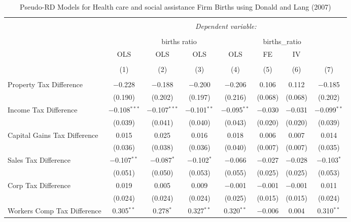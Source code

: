 
\begin{table}[!htbp] \centering 
  \caption{Pseudo-RD Models for  Health care and social assistance Firm Births using Donald and Lang (2007)} 
  \label{} 
\begin{tabular}{@{\extracolsep{5pt}}lccccccc} 
\\[-1.8ex]\hline 
\hline \\[-1.8ex] 
 & \multicolumn{7}{c}{\textit{Dependent variable:}} \\ 
\cline{2-8} 
\\[-1.8ex] & \multicolumn{4}{c}{births ratio} & \multicolumn{2}{c}{births\_ratio} &   \\ 
 & OLS & OLS & OLS & OLS & FE & IV &  \\ 
\\[-1.8ex] & (1) & (2) & (3) & (4) & (5) & (6) & (7)\\ 
\hline \\[-1.8ex] 
 Property Tax Difference & $-$0.228 & $-$0.188 & $-$0.200 & $-$0.206 & 0.106 & 0.112 & $-$0.185 \\ 
  & (0.190) & (0.202) & (0.197) & (0.216) & (0.068) & (0.068) & (0.202) \\ 
  Income Tax Difference & $-$0.108$^{***}$ & $-$0.107$^{***}$ & $-$0.101$^{**}$ & $-$0.095$^{**}$ & $-$0.030 & $-$0.031 & $-$0.099$^{**}$ \\ 
  & (0.039) & (0.041) & (0.040) & (0.043) & (0.020) & (0.020) & (0.039) \\ 
  Capital Gains Tax Difference & 0.015 & 0.025 & 0.016 & 0.018 & 0.006 & 0.007 & 0.014 \\ 
  & (0.036) & (0.038) & (0.036) & (0.040) & (0.007) & (0.007) & (0.035) \\ 
  Sales Tax Difference & $-$0.107$^{**}$ & $-$0.087$^{*}$ & $-$0.102$^{*}$ & $-$0.066 & $-$0.027 & $-$0.028 & $-$0.103$^{*}$ \\ 
  & (0.051) & (0.050) & (0.053) & (0.055) & (0.025) & (0.025) & (0.053) \\ 
  Corp Tax Difference & 0.019 & 0.005 & 0.009 & $-$0.001 & $-$0.001 & $-$0.001 & 0.011 \\ 
  & (0.024) & (0.024) & (0.024) & (0.025) & (0.015) & (0.015) & (0.024) \\ 
  Workers Comp Tax Difference & 0.305$^{**}$ & 0.278$^{*}$ & 0.327$^{**}$ & 0.320$^{**}$ & $-$0.006 & 0.004 & 0.310$^{**}$ \\ 

\end{tabular}
\end{table}
